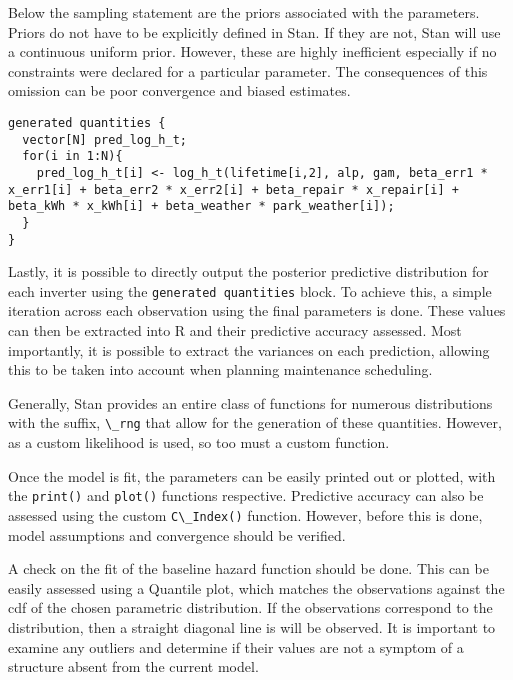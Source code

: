 Below the sampling statement are the priors associated with the parameters. Priors do not have to be explicitly defined in Stan. If they are not, Stan will use a continuous uniform prior. However, these are highly inefficient especially if no constraints were declared for a particular parameter. The consequences of this omission can be poor convergence and biased estimates. 



\begin{lstlisting}
generated quantities {
  vector[N] pred_log_h_t;
  for(i in 1:N){
    pred_log_h_t[i] <- log_h_t(lifetime[i,2], alp, gam, beta_err1 * x_err1[i] + beta_err2 * x_err2[i] + beta_repair * x_repair[i] + beta_kWh * x_kWh[i] + beta_weather * park_weather[i]);
  }
}
\end{lstlisting}

Lastly, it is possible to directly output the posterior predictive distribution for each inverter using the \lstinline{generated quantities} block. To achieve this, a simple iteration across each observation using the final parameters is done. These values can then be extracted into R and their predictive accuracy assessed. Most importantly, it is possible to extract the variances on each prediction, allowing this to be taken into account when planning maintenance scheduling. 

Generally, Stan provides an entire class of functions for numerous distributions with the suffix, \lstinline{\_rng} that allow for the generation of these quantities. However, as a custom likelihood is used, so too must a custom function.

Once the model is fit, the parameters can be easily printed out or plotted, with the \lstinline{print()} and \lstinline{plot()} functions respective. Predictive accuracy can also be assessed using the custom \lstinline{C\_Index()} function. However, before this is done, model assumptions and convergence should be verified. 


A check on the fit of the baseline hazard function should be done. This can be easily assessed using a Quantile plot, which matches the observations against the cdf of the chosen parametric distribution. If the observations correspond to the distribution, then a straight diagonal line is will be observed. It is important to examine any outliers and determine if their values are not a symptom of a structure absent from the current model. 

